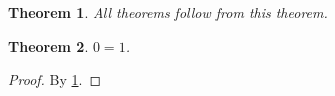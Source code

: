 \documentclass{article}
\newtheorem{theorem}{Theorem}
\begin{document}
\begin{theorem}
  \label{thm:all-theorems}
  All theorems follow from this theorem.
\end{theorem}

\begin{theorem}
  \(0 = 1\).
\end{theorem}
\begin{proof}
  By \cref{thm:all-theorems}.
\end{proof}
\end{document}

